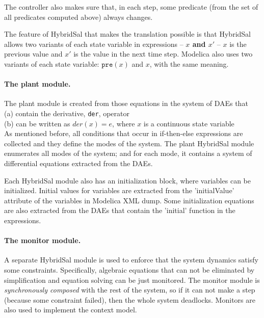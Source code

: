 \documentclass{llncs}
\begin{document}
The controller also makes sure that, in each step, some predicate 
(from the set of all predicates computed above) always changes.

The feature of HybridSal that makes the translation possible is that
HybridSal allows two variants of each state variable in expressions --
{\bf{$x$ and $x'$}} --  $x$ is the previous value  and $x'$ is the value in the
next time step.  Modelica also uses two variants of each state variable:
$\mathtt{pre}(x)$ and $x$, with the same meaning. 


\paragraph{The plant module.}

The plant module is created from those equations in the system of DAEs that
\\
(a) contain the derivative, {\tt{der}}, operator
\\
(b) can be written as $der(x) = e$, where $x$ is a continuous state variable
\\
As mentioned before, all conditions that occur in if-then-else expressions
are collected and they define the modes of the system.  The plant HybridSal
module enumerates all modes of the system; and for each mode, it contains
a system of differential equations extracted from the DAEs.

Each HybridSal module also has an initialization block, where variables
can be initialized.  Initial values for variables are extracted from the
'initialValue' attribute of the variables in Modelica XML dump.
Some initialization equations are also extracted from the DAEs that contain
the 'initial' function in the expressions.

\paragraph{The monitor module.}
A separate HybridSal module is used to enforce that the system dynamics satisfy
some constraints.  Specifically, algebraic equations that can not be eliminated
by simplification and equation solving can be just monitored. 
The monitor module is {\em{synchronously composed}} with the rest of the system,
so if it can not make a step (because some constraint failed), then the whole
system deadlocks.
Monitors are also used to implement the context model.
\end{document}
